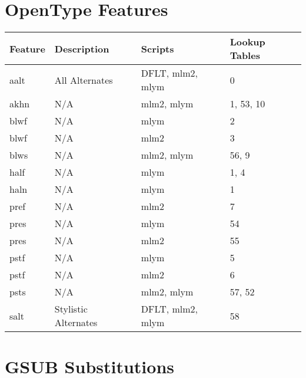 \section{OpenType Features}

    \begin{longtable}[l]{|l|p{}|p{}|l|}
    \hline
    \rowcolor{header}
    Feature & Description & Scripts & Lookup Tables \\
    \hline
    \endhead
    \hline
    \endfoot
  aalt & All Alternates & DFLT, mlm2, mlym & 0  \\
akhn & N/A & mlm2, mlym & 1, 53, 10  \\
blwf & N/A & mlym & 2  \\
blwf & N/A & mlm2 & 3  \\
blws & N/A & mlm2, mlym & 56, 9  \\
half & N/A & mlym & 1, 4  \\
haln & N/A & mlym & 1  \\
pref & N/A & mlm2 & 7  \\
pres & N/A & mlym & 54  \\
pres & N/A & mlm2 & 55  \\
pstf & N/A & mlym & 5  \\
pstf & N/A & mlm2 & 6  \\
psts & N/A & mlm2, mlym & 57, 52  \\
salt & Stylistic Alternates & DFLT, mlm2, mlym & 58  \\
\end{longtable}
\section{GSUB Substitutions}

